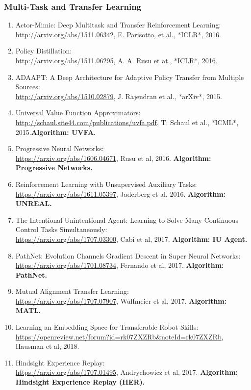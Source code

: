 \documentclass[lang=cn,11pt,a4paper]{eleganttemplate}
\begin{document}
\subsubsection{Multi-Task and Transfer Learning}
\begin{enumerate}
    \item Actor-Mimic: Deep Multitask and Transfer Reinforcement Learning:\\ \href{http://arxiv.org/abs/1511.06342}{http://arxiv.org/abs/1511.06342}, E. Parisotto, et al., *ICLR*, 2016.
    \item Policy Distillation:\\ \href{http://arxiv.org/abs/1511.06295}{http://arxiv.org/abs/1511.06295}, A. A. Rusu et at., *ICLR*, 2016.
    \item ADAAPT: A Deep Architecture for Adaptive Policy Transfer from Multiple Sources:\\ \href{http://arxiv.org/abs/1510.02879}{http://arxiv.org/abs/1510.02879}, J. Rajendran et al., *arXiv*, 2015.
    \item Universal Value Function Approximators:\\ \href{http://schaul.site44.com/publications/uvfa.pdf}{http://schaul.site44.com/publications/uvfa.pdf}, T. Schaul et al., *ICML*, 2015.\textbf{Algorithm: UVFA.}
    \item Progressive Neural Networks:\\ \href{https://arxiv.org/abs/1606.04671}{https://arxiv.org/abs/1606.04671}, Rusu et al, 2016. \textbf{Algorithm: Progressive Networks.}
    \item Reinforcement Learning with Unsupervised Auxiliary Tasks:\\ \href{https://arxiv.org/abs/1611.05397}{https://arxiv.org/abs/1611.05397}, Jaderberg et al, 2016. \textbf{Algorithm: UNREAL.}
    \item The Intentional Unintentional Agent: Learning to Solve Many Continuous Control Tasks Simultaneously:\\ \href{https://arxiv.org/abs/1707.03300}{https://arxiv.org/abs/1707.03300}, Cabi et al, 2017. \textbf{Algorithm: IU Agent.}
    \item PathNet: Evolution Channels Gradient Descent in Super Neural Networks:\\ \href{https://arxiv.org/abs/1701.08734}{https://arxiv.org/abs/1701.08734}, Fernando et al, 2017. \textbf{Algorithm: PathNet.}
    \item Mutual Alignment Transfer Learning:\\ \href{https://arxiv.org/abs/1707.07907}{https://arxiv.org/abs/1707.07907}, Wulfmeier et al, 2017. \textbf{Algorithm: MATL.}
    \item Learning an Embedding Space for Transferable Robot Skills:\\ \href{https://openreview.net/forum?id=rk07ZXZRb&noteId=rk07ZXZRb}{https://openreview.net/forum?id=rk07ZXZRb\&noteId=rk07ZXZRb}, Hausman et al, 2018.
    \item Hindsight Experience Replay:\\ \href{https://arxiv.org/abs/1707.01495}{https://arxiv.org/abs/1707.01495}, Andrychowicz et al, 2017. \textbf{Algorithm: Hindsight Experience Replay (HER).}
\end{enumerate}
\end{document}
